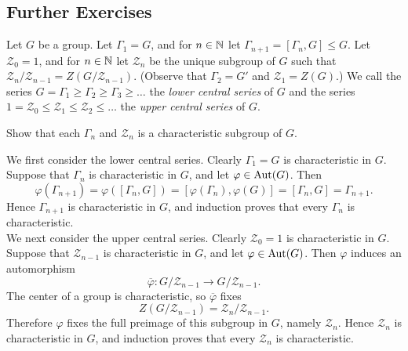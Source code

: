 \documentclass[../Odyssey_Project.tex]{subfiles}
\begin{document}
\subsection*{Further Exercises}

Let $G$ be a group. Let $\Gamma_1 = G$, and for $n \in \mathbb{N}$ let $\Gamma_{n+1} = [\Gamma_n, G] \leq G$. Let $\mathcal{Z}_0 = 1$, and for $n \in \mathbb{N}$ let $\mathcal{Z}_n$ be the unique subgroup of $G$ such that $\mathcal{Z}_n / \mathcal{Z}_{n-1} = Z(G/\mathcal{Z}_{n-1})$. (Observe that $\Gamma_2 = G'$ and $\mathcal{Z}_1 = Z(G)$.) We call the series $G = \Gamma_1 \geq \Gamma_2 \geq \Gamma_3 \geq \ldots$ the \emph{lower central series} of $G$ and the series $1 = \mathcal{Z}_0 \leq \mathcal{Z}_1 \leq \mathcal{Z}_2 \leq \ldots$ the \emph{upper central series} of $G$.

\begin{exercise}
\label{ex:11.9}
Show that each $\Gamma_n$ and $\mathcal{Z}_n$ is a characteristic subgroup of $G$.
\end{exercise}
\begin{solution}
    We first consider the lower central series. Clearly $\Gamma_1=G$ is characteristic in $G$. Suppose that $\Gamma_n$ is characteristic in $G$, and let $\varphi\in\operatorname{Aut}(G)$. Then
    \[
        \varphi(\Gamma_{n+1})
        =\varphi([\Gamma_n,G])
        =[\varphi(\Gamma_n),\varphi(G)]
        =[\Gamma_n,G]
        =\Gamma_{n+1}.
    \]
    Hence $\Gamma_{n+1}$ is characteristic in $G$, and induction proves that every $\Gamma_n$ is characteristic.\\
    We next consider the upper central series. Clearly $\mathcal{Z}_0=1$ is characteristic in $G$. Suppose that $\mathcal{Z}_{n-1}$ is characteristic in $G$, and let $\varphi\in\operatorname{Aut}(G)$. Then $\varphi$ induces an automorphism
    \[
        \overline{\varphi}\colon G/\mathcal{Z}_{n-1}\to G/\mathcal{Z}_{n-1}.
    \]
    The center of a group is characteristic, so $\overline{\varphi}$ fixes
    \[
        Z(G/\mathcal{Z}_{n-1})=\mathcal{Z}_n/\mathcal{Z}_{n-1}.
    \]
    Therefore $\varphi$ fixes the full preimage of this subgroup in $G$, namely $\mathcal{Z}_n$. Hence $\mathcal{Z}_n$ is characteristic in $G$, and induction proves that every $\mathcal{Z}_n$ is characteristic.
\end{solution}
\end{document}
